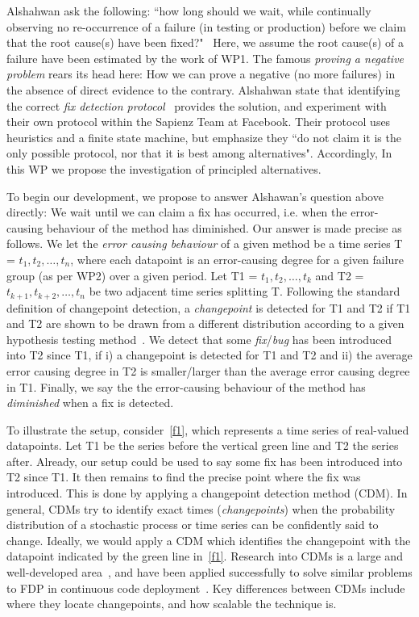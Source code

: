 
Alshahwan \etal ask the following: ``how long  should we wait, while continually observing no re-occurrence of a failure (in testing or production)
before we claim that the root cause(s) have been fixed?"~\cite{Facebook1}  Here, we assume the root cause(s) of a failure have been estimated by the work of WP1. The famous \textit{proving a negative problem} rears its head here: How we can prove a negative (no more failures) in the absence of direct evidence to the contrary.  
Alshahwan \etal state that identifying the correct \textit{fix detection protocol}~\cite{Facebook1} provides the solution, and experiment with their own protocol within the Sapienz Team
at Facebook. Their protocol uses heuristics and a finite state machine, but emphasize they ``do not claim it is the only possible protocol, nor that it is best among alternatives".  Accordingly, In this WP we propose the investigation of principled alternatives.

To begin our development, we propose to answer Alshawan's question above directly: We wait until we can claim a fix has occurred, i.e. when the error-causing behaviour of the method has diminished. 
Our answer is made precise as follows. 
We let the \textit{error causing behaviour} of a given method be a time series T = $t_1, t_2, \dots, t_n$, where each datapoint is an error-causing degree for a given failure group (as per WP2) over a given period. Let T1 = $t_1, t_2, \dots , t_k$ and T2 = $t_{k+1}, t_{k+2}, \dots , t_n$ be two adjacent time series splitting T.  Following the standard definition of changepoint detection, a \textit{changepoint} is detected for T1 and T2 if T1 and T2 are shown to be drawn from a different distribution according to a given hypothesis testing method~\citep{Aminikhanghahi, arXiv:1411.7955}.
We detect that some \textit{fix}/\textit{bug} has been introduced into T2 since T1, if i) a changepoint is detected for T1 and T2 and ii) the average error causing degree in T2 is smaller/larger than the average error causing degree in T1. Finally, we say the the error-causing behaviour of the method has \textit{diminished} when a fix is detected.

To illustrate the setup, consider~\autoref{f1}, which represents a time series of real-valued datapoints. Let T1 be the series before the vertical green line and T2 the series after. Already, our setup could be used to say some fix has been introduced into T2 since T1. It then remains to find the precise point where the fix was introduced. This is done by applying a changepoint detection method (CDM). In general, CDMs try to identify exact times (\textit{changepoints}) when the probability distribution of a stochastic process or time series can be confidently said to change. 
Ideally, we would apply a CDM which identifies the changepoint with the datapoint indicated by the green line in~\autoref{f1}.  
Research into CDMs is a large and well-developed area~\citep{Aminikhanghahi, arXiv:1411.7955}, and have been applied successfully to solve similar problems to FDP in continuous code deployment~\cite{arXiv:1411.7955}. Key differences between CDMs include where they locate changepoints, and how scalable the technique is. 





